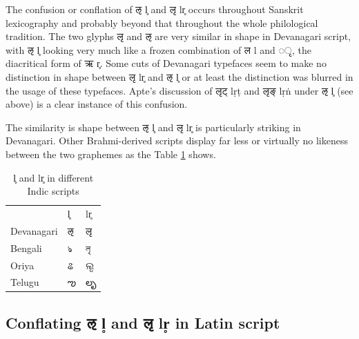 The confusion or conflation of {\devfont ऌ} l̥  and {\devfont लृ} lr̥ occurs throughout Sanskrit lexicography and probably beyond that throughout the whole philological tradition. The two glyphs {\devfont लृ} and {\devfont ऌ} are very similar in shape in Devanagari script, with {\devfont ऌ} l̥ looking very much like a frozen combination of {\devfont ल} l and {\devfont ◌ृ}, the diacritical form of {\devfont ऋ} r̥. Some cuts of Devanagari typefaces seem to make no distinction in shape between  {\devfont लृ} lr̥ and {\devfont ऌ} l̥ or at least the distinction was blurred in the usage of these typefaces. Apte’s discussion of {\devfont लृट्} lṛṭ and {\devfont लृङ्} lṛṅ under {\devfont ऌ} l̥  (see above) is a clear instance of this confusion.

The similarity is shape between {\devfont ऌ} l̥ and {\devfont लृ} lr̥ is particularly striking in Devanagari. Other Brahmi-derived scripts display far less or virtually no likeness between the two graphemes as the Table \ref{tab:indic} shows. 

\begin{table}[!h]
\begin{center}
\begin{tabular}{lll}
&l̥&lr̥\\
Devanagari&{\devfont ऌ}&{\devfont लृ}\\
Bengali&{\bangfont ঌ}&{\bangfont লৃ}\\
Oriya&{\orifont ଌ}&{\orifont ଲୃ}\\
Telugu&{\telfont ఌ}&{\telfont లృ}\\
\end{tabular}
\end{center}
\caption[l̥ and lr̥ in different Indic scripts]{\label{tab:indic}l̥ and lr̥ in different Indic scripts}
\end{table}


\subsection{Conflating {\devhmfont ऌ} l̥ and {\devhmfont लृ} lr̥ in Latin script}

